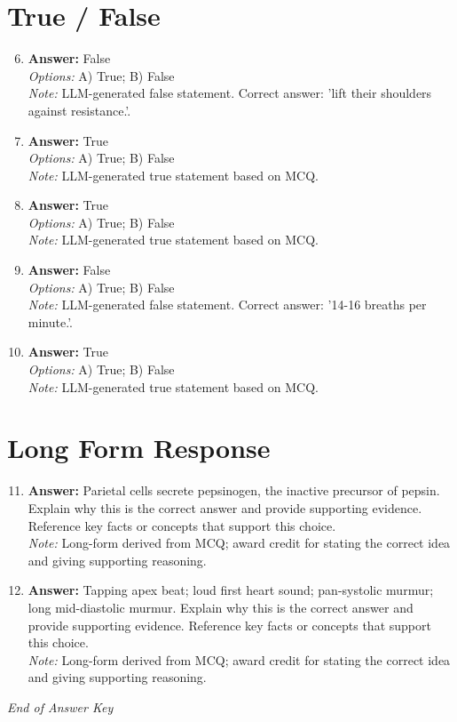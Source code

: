 \documentclass[12pt]{article}
\begin{document}
\section*{True / False}
\begin{enumerate}[label=\arabic*.]
\setcounter{enumi}{5}
\item \textbf{Answer:} False
\\ \textit{Options:} A) True; B) False
\\ \textit{Note:} LLM-generated false statement. Correct answer: 'lift their shoulders against resistance.'.
\item \textbf{Answer:} True
\\ \textit{Options:} A) True; B) False
\\ \textit{Note:} LLM-generated true statement based on MCQ.
\item \textbf{Answer:} True
\\ \textit{Options:} A) True; B) False
\\ \textit{Note:} LLM-generated true statement based on MCQ.
\item \textbf{Answer:} False
\\ \textit{Options:} A) True; B) False
\\ \textit{Note:} LLM-generated false statement. Correct answer: '14-16 breaths per minute.'.
\item \textbf{Answer:} True
\\ \textit{Options:} A) True; B) False
\\ \textit{Note:} LLM-generated true statement based on MCQ.
\end{enumerate}

\section*{Long Form Response}
\begin{enumerate}[label=\arabic*.]
\setcounter{enumi}{10}
\item \textbf{Answer:} Parietal cells secrete pepsinogen, the inactive precursor of pepsin. Explain why this is the correct answer and provide supporting evidence. Reference key facts or concepts that support this choice.
\\ \textit{Note:} Long-form derived from MCQ; award credit for stating the correct idea and giving supporting reasoning.
\item \textbf{Answer:} Tapping apex beat; loud first heart sound; pan-systolic murmur; long mid-diastolic murmur. Explain why this is the correct answer and provide supporting evidence. Reference key facts or concepts that support this choice.
\\ \textit{Note:} Long-form derived from MCQ; award credit for stating the correct idea and giving supporting reasoning.
\end{enumerate}

\vfill
\noindent\textit{End of Answer Key}
\end{document}
